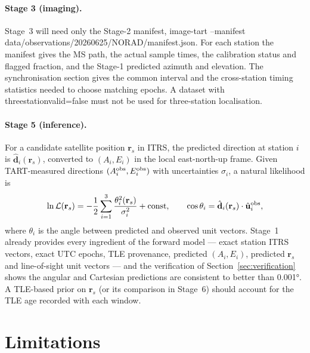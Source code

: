 \documentclass[11pt,a4paper]{article}
\newcommand{\code}[1]{{\ttfamily\def\_{\textunderscore\allowbreak}#1}}
\newcommand{\vect}[1]{\mathbf{#1}}
\begin{document}
\paragraph{Stage 3 (imaging).} Stage~3 will need only the Stage-2 manifest,
\code{image-tart --manifest data/observations/20260625/NORAD\_40534/manifest.json}.
For each station the manifest gives the MS path, the actual sample times,
the calibration status and flagged fraction, and the Stage-1 predicted
azimuth and elevation. The synchronisation section gives the common
interval and the cross-station timing statistics needed to choose matching
epochs. A dataset with \code{three\_station\_valid=false} must not be used
for three-station localisation.

\paragraph{Stage 5 (inference).} For a candidate satellite position
$\vect r_s$ in ITRS, the predicted direction at station $i$ is
$\hat{\vect d}_i(\vect r_s)$, converted to $(A_i,E_i)$ in the local
east-north-up frame. Given TART-measured directions
$(A_i^{\rm obs},E_i^{\rm obs})$ with uncertainties $\sigma_i$, a natural
likelihood is
\begin{equation}
\ln\mathcal L(\vect r_s) = -\frac12\sum_{i=1}^{3}
\frac{\theta_i^2(\vect r_s)}{\sigma_i^2} + \text{const},\qquad
\cos\theta_i = \hat{\vect d}_i(\vect r_s)\cdot\hat{\vect u}_i^{\rm obs},
\end{equation}
where $\theta_i$ is the angle between predicted and observed unit vectors.
Stage~1 already provides every ingredient of the forward model --- exact
station ITRS vectors, exact UTC epochs, TLE provenance, predicted
$(A_i,E_i)$, predicted $\vect r_s$ and line-of-sight unit vectors --- and the
verification of Section~\ref{sec:verification} shows the angular and
Cartesian predictions are consistent to better than \ang{0.001}. A
TLE-based prior on $\vect r_s$ (or its comparison in Stage~6) should account
for the TLE age recorded with each window.

\section{Limitations}
\end{document}
